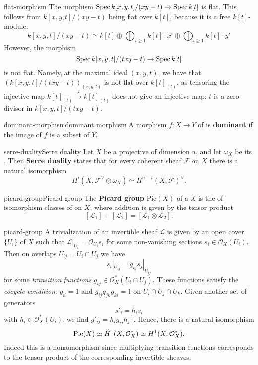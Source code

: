 \begin{example}{flat-morphism}
    The morphism $\operatorname{Spec} k[x, y, t] / (xy - t) \to \operatorname{Spec} k[t]$ is flat. This follows from $k[x, y, t] / (xy - t)$ being flat over $k[t]$, because it is a free $k[t]$-module:
    \[ k[x, y, t] / (xy - t) \simeq k[t] \oplus \bigoplus_{i \ge 1} k[t] \cdot x^i \oplus \bigoplus_{i \ge 1} k[t] \cdot y^i \]
    However, the morphism
    \[ \operatorname{Spec} k[x, y, t] / (txy - t) \to \operatorname{Spec} k[t] \]
    is not flat. Namely, at the maximal ideal $(x, y, t)$, we have that $(k[x, y, t] / (txy - t))_{(x, y, t)}$ is not flat over $k[t]_{(t)}$, as tensoring the injective map $k[t]_{(t)} \xrightarrow{\cdot t} k[t]_{(t)}$ does not give an injective map: $t$ is a zero-divisor in $k[x, y, t] / (txy - t)$.
\end{example}

\begin{topic}{dominant-morphism}{dominant morphism}
    A morphism $f : X \to Y$ of  is \textbf{dominant} if the image of $f$ is a  subset of $Y$.
\end{topic}

\begin{topic}{serre-duality}{Serre duality}
    Let $X$ be a  projective  of dimension $n$, and let $\omega_X$ be its . Then \textbf{Serre duality} states that for every coherent sheaf $\mathcal{F}$ on $X$ there is a natural isomorphism
    \[ H^i(X, \mathcal{F}^\vee \otimes \omega_X) \simeq H^{n - i}(X, \mathcal{F})^\vee . \]
\end{topic}

\begin{topic}{picard-group}{Picard group}
    The \textbf{Picard group} $\text{Pic}(X)$ of a  $X$ is the  of isomorphism classes of  on $X$, where addition is given by the tensor product
    \[ [\mathcal{L}_1] + [\mathcal{L}_2] = [\mathcal{L}_1 \otimes \mathcal{L}_2] . \]
\end{topic}

\begin{example}{picard-group}
    A trivialization of an invertible sheaf $\mathcal{L}$ is given by an open cover $\{ U_i \}$ of $X$ such that $\mathcal{L}|_{U_i} = \mathcal{O}_{U_i} s_i$ for some non-vanishing sections $s_i \in \mathcal{O}_X(U_i)$. Then on overlaps $U_{ij} = U_i \cap U_j$ we have
    \[ s_i|_{U_{ij}} = g_{ij} s_j|_{U_{ij}} \]
    for some \textit{transition functions} $g_{ij} \in \mathcal{O}_X^*(U_i \cap U_j)$. These functions satisfy the \textit{cocycle condition}: $g_{ii} = 1$ and $g_{ij} g_{jk} g_{ki} = 1$ on $U_i \cap U_j \cap U_k$. Given another set of generators
    \[ s'_i = h_i s_i \]
    with $h_i \in \mathcal{O}_X^*(U_i)$, we find $g'_{ij} = h_i g_{ij} h_j^{-1}$. Hence, there is a natural isomorphism
    \[ \textup{Pic}(X) \simeq \check{H}^1(X, \mathcal{O}_X^*) \simeq H^1(X, \mathcal{O}_X^*) . \]
    Indeed this is a homomorphism since multiplying transition functions corresponds to the tensor product of the corresponding invertible sheaves.
\end{example}

